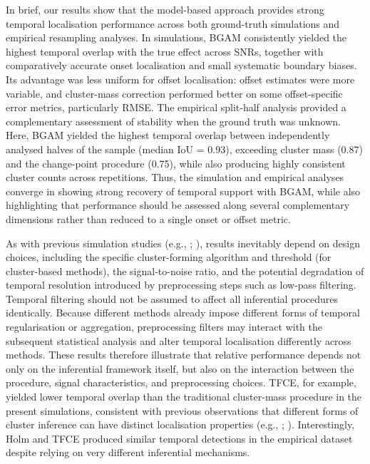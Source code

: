 \documentclass[
  doc,
  floatsintext,
  longtable,
  a4paper,
  nolmodern,
  notxfonts,
  notimes,
  colorlinks=true,linkcolor=blue,citecolor=blue,urlcolor=blue]{apa7}
\begin{document}
In brief, our results show that the model-based approach provides strong
temporal localisation performance across both ground-truth simulations
and empirical resampling analyses. In simulations, BGAM consistently
yielded the highest temporal overlap with the true effect across SNRs,
together with comparatively accurate onset localisation and small
systematic boundary biases. Its advantage was less uniform for offset
localisation: offset estimates were more variable, and cluster-mass
correction performed better on some offset-specific error metrics,
particularly RMSE. The empirical split-half analysis provided a
complementary assessment of stability when the ground truth was unknown.
Here, BGAM yielded the highest temporal overlap between independently
analysed halves of the sample (median IoU = 0.93), exceeding cluster
mass (0.87) and the change-point procedure (0.75), while also producing
highly consistent cluster counts across repetitions. Thus, the
simulation and empirical analyses converge in showing strong recovery of
temporal support with BGAM, while also highlighting that performance
should be assessed along several complementary dimensions rather than
reduced to a single onset or offset metric.

As with previous simulation studies (e.g.,
;
), results
inevitably depend on design choices, including the specific
cluster-forming algorithm and threshold (for cluster-based methods), the
signal-to-noise ratio, and the potential degradation of temporal
resolution introduced by preprocessing steps such as low-pass filtering.
Temporal filtering should not be assumed to affect all inferential
procedures identically. Because different methods already impose
different forms of temporal regularisation or aggregation, preprocessing
filters may interact with the subsequent statistical analysis and alter
temporal localisation differently across methods. These results
therefore illustrate that relative performance depends not only on the
inferential framework itself, but also on the interaction between the
procedure, signal characteristics, and preprocessing choices. TFCE, for
example, yielded lower temporal overlap than the traditional
cluster-mass procedure in the present simulations, consistent with
previous observations that different forms of cluster inference can have
distinct localisation properties (e.g.,
;
). Interestingly,
Holm and TFCE produced similar temporal detections in the empirical
dataset despite relying on very different inferential mechanisms.
\end{document}
